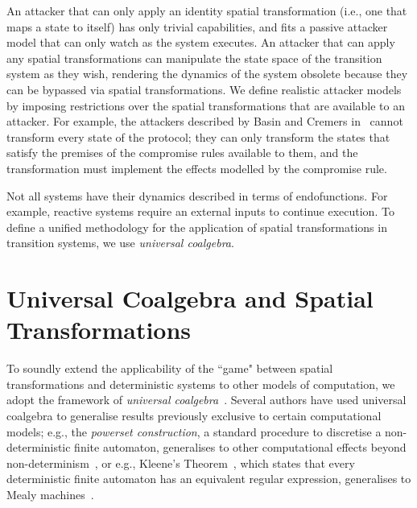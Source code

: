 An attacker that can only apply an identity spatial transformation (i.e., one that maps a state to itself) has only trivial capabilities, and fits a passive attacker model that can only watch as the system executes. An attacker that can apply any spatial transformations can manipulate the state space of the transition system as they wish, rendering the dynamics of the system obsolete because they can be bypassed via spatial transformations. We define realistic attacker models by imposing restrictions over the spatial transformations that are available to an attacker. %
For example, the attackers described by Basin and Cremers in~\cite{KnowYourEnemy} cannot transform every state of the protocol; they can only transform the states that satisfy the premises of the
compromise rules available to them, and the transformation must implement the effects modelled by the compromise rule. %

Not all systems have their dynamics described in terms of endofunctions. For example, reactive systems require an external inputs to continue execution. To define a unified methodology for the application of spatial transformations in transition systems, we use \emph{universal coalgebra}.




\section{Universal Coalgebra and Spatial Transformations}
To soundly extend the applicability of the ``game" between spatial transformations and deterministic systems to other models of computation, we adopt the framework of \emph{universal coalgebra}~\cite{UniversalCoalgebra}.  
Several authors have used universal coalgebra to generalise results previously exclusive to certain computational models; e.g., the \emph{powerset construction}, a standard procedure to discretise a non-deterministic finite automaton, generalises to other computational effects beyond non-determinism~\cite{GeneralisingDetermination}, or e.g., Kleene's Theorem~\cite{KleenesTheorem}, which states that every deterministic finite automaton has an equivalent regular expression, generalises to Mealy machines~\cite{KleeneCoalgebra}.  

